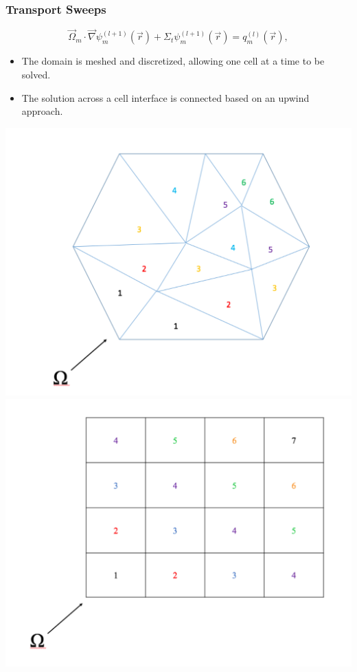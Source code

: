 \documentclass[xcolor={usenames,dvipsnames,svgnames,table}]{beamer}
\newcommand{\vr}{\vec{r}}
\newcommand{\vo}{\vec{\Omega}}
\begin{document}
\begin{frame}[t]\frametitle{Transport Sweeps}
\begin{block}{}
\begin{equation}
\vo_m \cdot \vec\nabla \psi_m^{(l+1)}(\vr) + \Sigma_t \psi_m^{(l+1)}(\vr) = q_m^{(l)}(\vr),
\label{iteration}
\end{equation}
\begin{itemize}
\item The domain is meshed and discretized, allowing one cell at a time to be solved.
\item The solution across a cell interface is connected based on an upwind approach.
\end{itemize}
\end{block}
\centering
\includegraphics[scale = 0.15]{figures/UnstructureMesh.pdf}
\includegraphics[scale = 0.15]{figures/StructuredMesh.pdf}
\end{frame}
\end{document}
